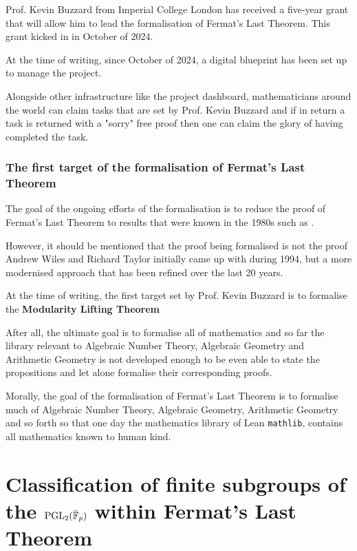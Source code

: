 Prof. Kevin Buzzard from Imperial College London has received a five-year grant that will allow him to lead the formalisation of Fermat's Last Theorem. This grant kicked in in October of 2024. 

At the time of writing, since October of 2024, a digital blueprint has been set up to manage the project.

Alongside other infrastructure like the project dashboard, mathematicians around the world can claim tasks that are set by Prof. Kevin Buzzard and if in return a task is returned with a "sorry" free proof then one can claim the glory of having completed the task.

\subsubsection{The first target of the formalisation of Fermat's Last Theorem}

The goal of the ongoing efforts of the formalisation is to reduce the proof of Fermat's Last Theorem to results that were known in the 1980s such as .

However, it should be mentioned that the proof being formalised is not the proof Andrew Wiles and Richard Taylor initially came up with during 1994, but a more modernised approach that has been refined over the last 20 years.

At the time of writing, the first target set by Prof. Kevin Buzzard is to formalise the \textbf{Modularity Lifting Theorem}



After all, the ultimate goal is to formalise all of mathematics and so far the library relevant to Algebraic Number Theory, Algebraic Geometry and Arithmetic Geometry is not developed enough
to be even able to state the propositions and let alone formalise their corresponding proofs.

Morally, the goal of the formalisation of Fermat's Last Theorem is to formalise much of Algebraic Number Theory, Algebraic Geometry, Arithmetic Geometry and so forth so that one day
the mathematics library of Lean \texttt{mathlib}, contains all mathematics known to human kind.



\section{Classification of finite subgroups of the $\operatorname{PGL}_2(\bar{\mathbb{F}}_p)$ within Fermat's Last Theorem}

